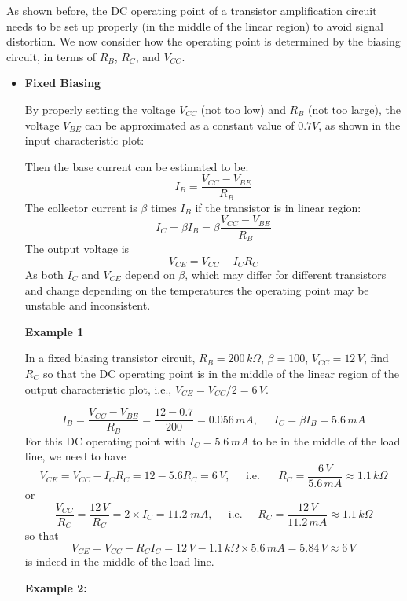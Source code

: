 As shown before, the DC operating point of a transistor amplification circuit
needs to be set up properly (in the middle of the linear region) to avoid
signal distortion. We now consider how the operating point is determined by 
the biasing circuit, in terms of $R_B$, $R_C$, and $V_{CC}$.

\begin{itemize}
\item {\bf Fixed Biasing} 


By properly setting the voltage $V_{CC}$ (not too low) and $R_B$ (not too 
large), the voltage $V_{BE}$ can be approximated as a constant value of
$0.7V$, as shown in the input characteristic plot: 


Then the base current can be estimated to be:
\[
I_B=\frac{V_{CC}-V_{BE}}{R_B} %
\]
The collector current is $\beta$ times $I_B$ if the transistor is in linear
region:
\[
I_C=\beta I_B=\beta \frac{V_{CC}-V_{BE}}{R_B} %
\]
The output voltage is 
\[
V_{CE}=V_{CC}-I_C R_C	
\]
As both $I_C$ and $V_{CE}$ depend on $\beta$, which may differ for different
transistors and change depending on the temperatures the operating point may
be unstable and inconsistent. 


{\bf Example 1}

In a fixed biasing transistor circuit, $R_B=200\,k\Omega$, $\beta=100$, 
$V_{CC}=12\,V$, find $R_C$ so that the DC operating point is in the middle
of the linear region of the output characteristic plot, i.e., 
$V_{CE}=V_{CC}/2=6\,V$.

\[ 
I_B=\frac{V_{CC}-V_{BE}}{R_B}=\frac{12-0.7}{200}=0.056\,mA,\;\;\;\;\;
I_C=\beta I_B=5.6\,mA 
\]
For this DC operating point with $I_C=5.6\,mA$ to be in the middle of the
load line, we need to have 
\[
V_{CE}=V_{CC}-I_CR_C=12-5.6 R_C=6\,V,\;\;\;\;\;\mbox{i.e.}\;\;\;\;\;\;
R_C=\frac{6\,V}{5.6\,mA}\approx 1.1\,k\Omega
\]
or
\[ 
\frac{V_{CC}}{R_C}=\frac{12\,V}{R_C}=2\times I_C=11.2\;mA,\;\;\;\;\;\mbox{i.e.}
\;\;\;\;\;R_C=\frac{12\,V}{11.2\,mA}\approx 1.1\,k\Omega
\]
so that
\[
V_{CE}=V_{CC}-R_CI_C=12\,V-1.1\,k\Omega\times 5.6\,mA=5.84\,V\approx 6\,V
\]
is indeed in the middle of the load line.



{\bf Example 2:} 


\end{itemize}
